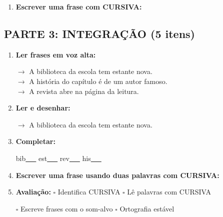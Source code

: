 \begin{exercicio}
\begin{enumerate}[resume]
  \item \textbf{Escrever uma frase com CURSIVA:}
  \begin{center}
  \underline{\hspace{12cm}}
  \end{center}

\end{enumerate}

\subsection*{PARTE 3: INTEGRAÇÃO (5 itens)}

\begin{enumerate}[resume]

  \item \textbf{Ler frases em voz alta:}
  \begin{center}
  $\rightarrow$ A biblioteca da escola tem estante nova.\\
  $\rightarrow$ A história do capítulo é de um autor famoso.\\
  $\rightarrow$ A revista abre na página da leitura.\\
  \end{center}

  \item \textbf{Ler e desenhar:}
  \begin{center}
  $\rightarrow$ A biblioteca da escola tem estante nova.
  \end{center}
  \begin{center}
  \end{center}

  \item \textbf{Completar:}
  \begin{center}
  bib\underline{~~~} \quad est\underline{~~~} \quad rev\underline{~~~} \quad his\underline{~~~}
  \end{center}

  \item \textbf{Escrever uma frase usando duas palavras com CURSIVA:}
  \begin{center}
  \underline{\hspace{12cm}}
  \end{center}

  \item \textbf{Avaliação:} $\square$ Identifica CURSIVA \quad $\square$ Lê palavras com CURSIVA
  \begin{center}
  $\square$ Escreve frases com o som-alvo \quad $\square$ Ortografia estável
  \end{center}


\end{enumerate}
\end{exercicio}
